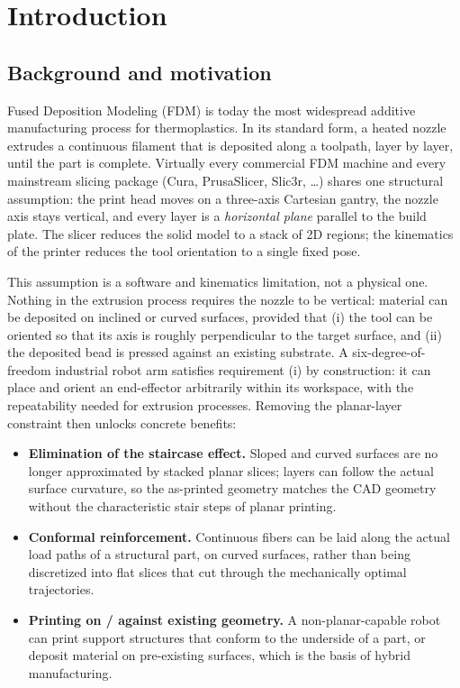 \section{Introduction}\label{sec:intro}

\subsection{Background and motivation}

Fused Deposition Modeling (FDM) is today the most widespread additive
manufacturing process for thermoplastics. In its standard form, a
heated nozzle extrudes a continuous filament that is deposited along a
toolpath, layer by layer, until the part is complete. Virtually every
commercial FDM machine and every mainstream slicing package
(Cura, PrusaSlicer, Slic3r, \dots) shares one structural assumption: the
print head moves on a three-axis Cartesian gantry, the nozzle axis
stays vertical, and every layer is a \emph{horizontal plane} parallel to
the build plate. The slicer reduces the solid model to a stack of 2D
regions; the kinematics of the printer reduces the tool orientation to
a single fixed pose.

This assumption is a software and kinematics limitation, not a physical
one. Nothing in the extrusion process requires the nozzle to be
vertical: material can be deposited on inclined or curved surfaces,
provided that (i) the tool can be oriented so that its axis is roughly
perpendicular to the target surface, and (ii) the deposited bead is
pressed against an existing substrate. A six-degree-of-freedom
industrial robot arm satisfies requirement (i) by construction: it can
place and orient an end-effector arbitrarily within its workspace,
with the repeatability needed for extrusion processes. Removing the
planar-layer constraint then unlocks concrete benefits:

\begin{itemize}
  \item \textbf{Elimination of the staircase effect.} Sloped and curved
        surfaces are no longer approximated by stacked planar slices;
        layers can follow the actual surface curvature, so the
        as-printed geometry matches the CAD geometry without the
        characteristic stair steps of planar printing.
  \item \textbf{Conformal reinforcement.} Continuous fibers can be laid
        along the actual load paths of a structural part, on curved
        surfaces, rather than being discretized into flat slices that
        cut through the mechanically optimal trajectories.
  \item \textbf{Printing on / against existing geometry.} A
        non-planar-capable robot can print support structures that
        conform to the underside of a part, or deposit material on
        pre-existing surfaces, which is the basis of hybrid
        manufacturing.
\end{itemize}

